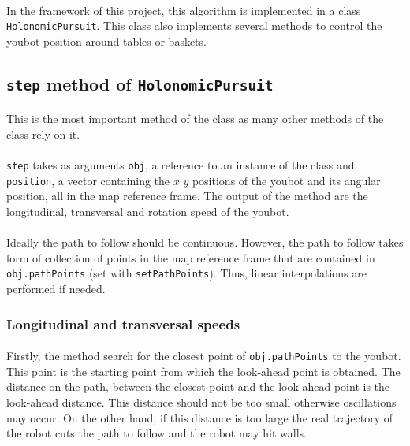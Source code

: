 \documentclass[12pt,a4paper]{article}
\begin{document}
\paragraph{} In the framework of this project, this algorithm is implemented in a class \texttt{HolonomicPursuit}. This class also  implements several methods to control the youbot position around tables or baskets.

\subsection{\texttt{step} method of \texttt{HolonomicPursuit}}
\paragraph{} This is the most important method of the class as many other methods of the class rely on it.

\paragraph{} \texttt{step} takes as arguments \texttt{obj}, a reference to an instance of the class and \texttt{position}, a vector containing the $x$ $y$ positions of the youbot and its angular position, all in the map reference frame. The output of the method are the longitudinal, transversal and rotation speed of the youbot.

\paragraph{} Ideally the path to follow should be continuous. However, the path to follow takes form of collection of points in the map reference frame that are contained in \texttt{obj.pathPoints} (set with \texttt{setPathPoints}). Thus, linear interpolations are performed if needed.

\subsubsection{Longitudinal and transversal speeds} \label{sec:longTransSpeed}
\paragraph{} Firstly, the method search for the closest point of \texttt{obj.pathPoints} to the youbot. This point is the starting point from which the look-ahead point is obtained. The distance on the path, between the closest point and the look-ahead point is the look-ahead distance. This distance should not be too small otherwise oscillations may occur. On the other hand, if this distance is too large the real trajectory of the robot cuts the path to follow and the robot may hit walls.
\end{document}
